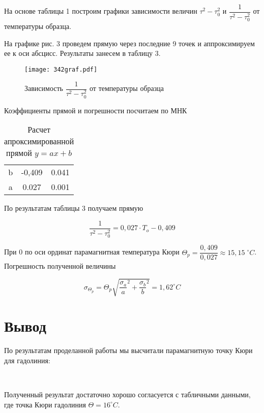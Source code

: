\documentclass[a4paper,13pt]{article}
\begin{document}
На основе таблицы 1 построим графики зависимости величин $ \tau^{2} - \tau_0^{2} $ и $ \dfrac{1}{\tau^2 - \tau_0^2} $ от температуры образца.
\par
На графике рис. 3 проведем прямую через последние 9 точек и аппроксимируем ее к оси абсцисс. Результаты занесем в таблицу 3.
\begin{figure}[h!]
	\centering
	\texttt{[image: 342graf.pdf]}
	\caption{Зависимость $ \dfrac{1}{ \tau^2 - \tau_0^2} $ от температуры образца}
	\label{C}
\end{figure}
Коэффициенты прямой и погрешности посчитаем по МНК
\begin{table}%
	\centering
	\caption{Расчет апроксимированной прямой $ y = ax +b $}
	\begin{tabular}{|c|c|c|}
        \hline
		\text{} & \text{Коэффициенты} & \text{Погрешности} \\\hline
		b & -0,409 & 0.041  \\\hline
		a & 0.027 & 0.001  \\
        \hline
	\end{tabular}
\end{table}
По результатам таблицы 3 получаем прямую 

\begin{equation}\label{}
 \dfrac{1}{\tau^{2} - \tau_0^{2}} = 0,027 \cdot T_o - 0,409
\end{equation}

При 0 по оси ординат парамагнитная температура Кюри $ \Theta_p = \dfrac{0,409}{0,027} \approx 15,15 \; ^\circ C$. Погрешность полученной величины

\begin{equation}\label{}
\sigma_{\Theta_p} = \Theta_p \sqrt{{\dfrac{\sigma_a}{a}^{2}} + {{\dfrac{\sigma_b}{b}}}^{2}} = 1,62^\circ C
\end{equation}
\section{Вывод}

По результатам проделанной работы мы высчитали парамагнитную точку Кюри для гадолиния:

\begin{center}
	{} \\
\end{center} 


Полученный результат достаточно хорошо согласуется с табличными данными, где точка Кюри гадолиния $ \Theta = 16  ^\circ C $.
\end{document}
